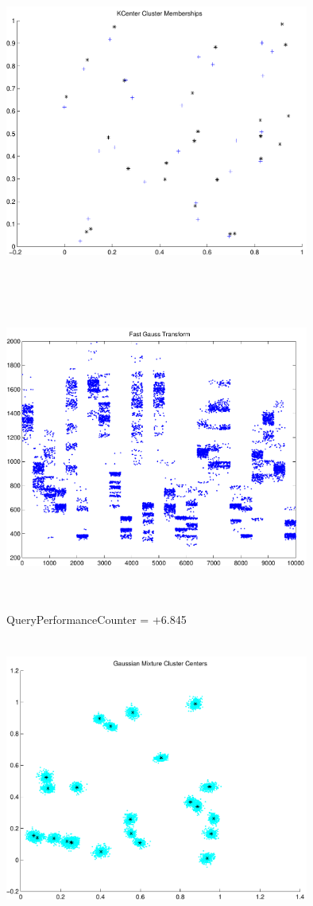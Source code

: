 \documentclass[9pt]{article}
\theoremstyle{plain}
\theoremstyle{definition}
\theoremstyle{remark}
\numberwithin{equation}{section}
\begin{document}
\includegraphics[width=10.0cm,height=10.0cm]{KCenterClusterMemberships_25_Centers.pdf}

\includegraphics[width=10.0cm,height=10.0cm]{FGT25_Centers.pdf}

QueryPerformanceCounter  =  +6.845
\includegraphics[width=10.0cm,height=10.0cm]{GaussianMixture_ClusterCenters24_Centers.pdf}
\end{document}
